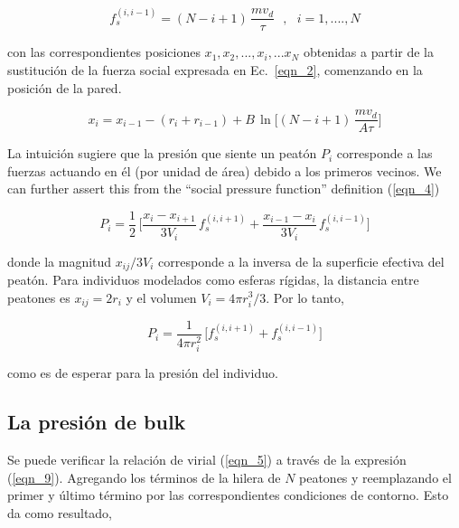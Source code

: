 \begin{equation}
f_s^{(i,i-1)}=(N-i+1)\,\displaystyle\frac{mv_d}{\tau}\ \ \ , \ \ \ 
i=1,....,N\label{eqn_7}
\end{equation}

\noindent con las correspondientes posiciones  $x_1,x_2,...,x_{i},...x_N$ obtenidas a partir de la sustitución de la fuerza social expresada en Ec.~\ref{eqn_2}, comenzando en la posición de la pared.

\begin{equation} 
x_i=x_{i-1}-(r_{i}+r_{i-1})+B\,\ln\bigg[(N-i+1)\,\displaystyle\frac{mv_d}{A\tau}
\bigg]\label{eqn_8}
\end{equation}

La intuición sugiere que la presión que siente un peatón $P_i$ 
corresponde a las fuerzas actuando en él (por unidad de área) debido a los primeros vecinos.  We can further assert this from the 
``social pressure function'' definition (\ref{eqn_4})  

\begin{equation}
P_i=\displaystyle\frac{1}{2}\,\bigg[\displaystyle\frac{x_{i}-x_{i+1}}{3V_i}\,
f_s^ { (i , i+1) } +\displaystyle\frac { x_ {i-1}-x_{i}}{3V_i}\,f_s^{(i,i-1) 
}\bigg]\label{eqn_9}
\end{equation}

\vspace{3mm}

\noindent donde la magnitud $x_{ij}/3V_i$ corresponde a la inversa de la superficie efectiva del peatón. Para individuos modelados como esferas rígidas, la distancia entre peatones es $x_{ij}=2r_i$ y el volumen $V_i=4\pi r_i^3/3$. Por lo tanto, 

\begin{equation}
P_i=\displaystyle\frac{1}{4\pi 
r_i^2}\,\bigg[f_s^ { (i , i+1) } +f_s^{(i,i-1)}\bigg]\label{eqn_10}
\end{equation}

\noindent como es de esperar para la presión del individuo.  \\

\subsection{\label{bulk_pressure}La presión de bulk}

Se puede verificar la relación de virial (\ref{eqn_5}) a través de la expresión (\ref{eqn_9}). Agregando los términos de la hilera de $N$ peatones y reemplazando el primer y último término por las correspondientes condiciones de contorno. Esto da como resultado,


